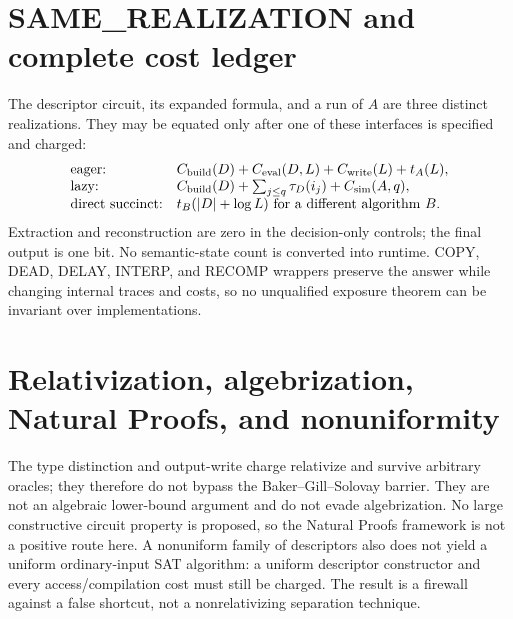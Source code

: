 \documentclass[11pt]{article}
\begin{document}
\section*{SAME\_REALIZATION and complete cost ledger}
The descriptor circuit, its expanded formula, and a run of $A$ are three
distinct realizations.  They may be equated only after one of these interfaces
is specified and charged:
\[
\begin{array}{ll}
\text{eager:}& C_{\rm build}(D)+C_{\rm eval}(D,L)+C_{\rm write}(L)+t_A(L),\\
\text{lazy:}& C_{\rm build}(D)+\sum_{j\le q}\tau_D(i_j)+C_{\rm sim}(A,q),\\
\text{direct succinct:}& t_B(|D|+\log L)\text{ for a different algorithm }B.
\end{array}
\]
Extraction and reconstruction are zero in the decision-only controls; the final
output is one bit.  No semantic-state count is converted into runtime.  COPY,
DEAD, DELAY, INTERP, and RECOMP wrappers preserve the answer while changing
internal traces and costs, so no unqualified exposure theorem can be invariant
over implementations.

\section*{Relativization, algebrization, Natural Proofs, and nonuniformity}
The type distinction and output-write charge relativize and survive arbitrary
oracles; they therefore do not bypass the Baker--Gill--Solovay barrier.  They
are not an algebraic lower-bound argument and do not evade algebrization.  No
large constructive circuit property is proposed, so the Natural Proofs
framework is not a positive route here.  A nonuniform family of descriptors
also does not yield a uniform ordinary-input SAT algorithm: a uniform
descriptor constructor and every access/compilation cost must still be charged.
The result is a firewall against a false shortcut, not a nonrelativizing
separation technique.
\end{document}
